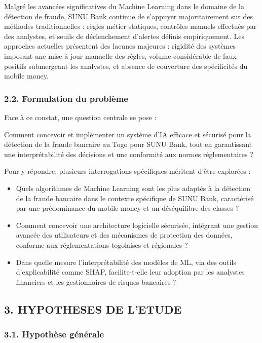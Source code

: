 \documentclass[
  12pt,
]{article}
\providecommand{\tightlist}{%
  \setlength{\itemsep}{0pt}\setlength{\parskip}{0pt}}
\begin{document}
Malgré les avancées significatives du Machine Learning dans le domaine
de la détection de fraude, SUNU Bank continue de s’appuyer
majoritairement sur des méthodes traditionnelles : règles métier
statiques, contrôles manuels effectués par des analystes, et seuils de
déclenchement d’alertes définis empiriquement. Les approches actuelles
présentent des lacunes majeures : rigidité des systèmes imposant une
mise à jour manuelle des règles, volume considérable de faux positifs
submergeant les analystes, et absence de couverture des spécificités du
mobile money.

\subsubsection{2.2. Formulation du
problème}\label{formulation-du-probluxe8me}

Face à ce constat, une question centrale se pose :

Comment concevoir et implémenter un système d’IA efficace et sécurisé
pour la détection de la fraude bancaire au Togo pour SUNU Bank, tout en
garantissant une interprétabilité des décisions et une conformité aux
normes réglementaires ?

Pour y répondre, plusieurs interrogations spécifiques méritent d’être
explorées :

\begin{itemize}
\tightlist
\item
  Quels algorithmes de Machine Learning sont les plus adaptés à la
  détection de la fraude bancaire dans le contexte spécifique de SUNU
  Bank, caractérisé par une prédominance du mobile money et un
  déséquilibre des classes ?
\item
  Comment concevoir une architecture logicielle sécurisée, intégrant une
  gestion avancée des utilisateurs et des mécanismes de protection des
  données, conforme aux réglementations togolaises et régionales ?
\item
  Dans quelle mesure l’interprétabilité des modèles de ML, via des
  outils d’explicabilité comme SHAP, facilite-t-elle leur adoption par
  les analystes financiers et les gestionnaires de risques bancaires ?
\end{itemize}

\subsection{3. HYPOTHESES DE L’ETUDE}\label{hypotheses-de-letude}

\subsubsection{3.1. Hypothèse
générale}\label{hypothuxe8se-guxe9nuxe9rale}
\end{document}
